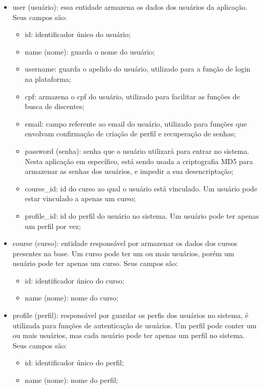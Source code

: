 \begin{itemize}
    
    \item user (usuário): essa entidade armazena os dados dos usuários da aplicação. Seus campos são:
    \begin{itemize}
        \item id: identificador único do usuário;
        \item name (nome): guarda o nome do usuário;
        \item username: guarda o apelido do usuário, utilizado para a função de login na plataforma;
        \item cpf: armazena o cpf do usuário, utilizado para facilitar as funções de busca de discentes;
        \item email: campo referente ao email do usuário, utilizado para funções que envolvam confirmação de criação de perfil e recuperação de senhas;
        \item password (senha): senha que o usuário utilizará para entrar no sistema. Nesta aplicação em específico, está sendo usada a criptografia MD5 para armazenar as senhas dos usuários, e impedir a sua desencriptação;
        \item course\_id: id do curso ao qual o usuário está vinculado. Um usuário pode estar vinculado a apenas um curso;
        \item profile\_id: id do perfil do usuário no sistema. Um usuário pode ter apenas um perfil por vez;
    \end{itemize}
    
    \item course (curso): entidade responsável por armazenar os dados dos cursos presentes na base. Um curso pode ter um ou mais usuários, porém um usuário pode ter apenas um curso. Seus campos são:
    \begin{itemize}
        \item id: identificador único do curso;
        \item name (nome): nome do curso;
    \end{itemize}
    
    \item profile (perfil): responsável por guardar os perfis dos usuários no sistema, é utilizada para funções de autenticação de usuários. Um perfil pode conter um ou mais usuários, mas cada usuário pode ter apenas um perfil no sistema. Seus campos são:
    \begin{itemize}
        \item id: identificador único do perfil;
        \item name (nome): nome do perfil;
    \end{itemize}
    

\end{itemize}
